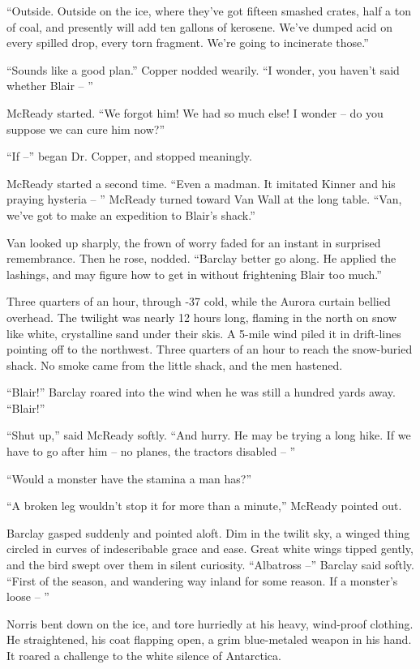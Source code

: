\documentclass[ebook,oneside,11pt]{memoir}				%
\begin{document}
``Outside. Outside on the ice, where they've got fifteen smashed crates, half a ton of coal, and presently will add ten gallons of kerosene. We've dumped acid on every spilled drop, every torn fragment. We're going to incinerate those.''

``Sounds like a good plan.'' Copper nodded wearily. ``I wonder, you haven't said whether Blair -- ''

McReady started. ``We forgot him! We had so much else! I wonder -- do you suppose we can cure him now?''

``If --'' began Dr. Copper, and stopped meaningly.

McReady started a second time. ``Even a madman. It imitated Kinner and his praying hysteria -- '' McReady turned toward Van Wall at the long table. ``Van, we've got to make an expedition to Blair's shack.''

Van looked up sharply, the frown of worry faded for an instant in surprised remembrance. Then he rose, nodded. ``Barclay better go along. He applied the lashings, and may figure how to get in without frightening Blair too much.''

Three quarters of an hour, through -37 cold, while the Aurora curtain bellied overhead. The twilight was nearly 12 hours long, flaming in the north on snow like white, crystalline sand under their skis. A 5-mile wind piled it in drift-lines pointing off to the northwest. Three quarters of an hour to reach the snow-buried shack. No smoke came from the little shack, and the men hastened.

``Blair!'' Barclay roared into the wind when he was still a hundred yards away. ``Blair!''

``Shut up,'' said McReady softly. ``And hurry. He may be trying a long hike. If we have to go after him -- no planes, the tractors disabled -- ''

``Would a monster have the stamina a man has?''

``A broken leg wouldn't stop it for more than a minute,'' McReady pointed out.

Barclay gasped suddenly and pointed aloft. Dim in the twilit sky, a winged thing circled in curves of indescribable grace and ease. Great white wings tipped gently, and the bird swept over them in silent curiosity. ``Albatross --'' Barclay said softly. ``First of the season, and wandering way inland for some reason. If a monster's loose -- ''

Norris bent down on the ice, and tore hurriedly at his heavy, wind-proof clothing. He straightened, his coat flapping open, a grim blue-metaled weapon in his hand. It roared a challenge to the white silence of Antarctica.
\end{document}
